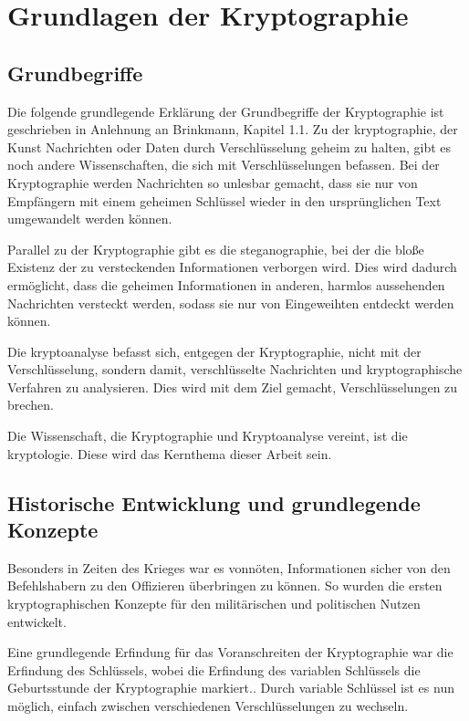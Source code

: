 \newpage


\section{Grundlagen der Kryptographie}\label{sec:grundlagen-der-kryptographie}

\subsection{Grundbegriffe}\label{subsec:grundbegriffe}
Die folgende grundlegende Erklärung der Grundbegriffe der Kryptographie ist
geschrieben in Anlehnung an Brinkmann, Kapitel 1.1. Zu der \gls{kryptographie},
der Kunst Nachrichten oder Daten durch Verschlüsselung geheim zu halten, gibt es
noch andere Wissenschaften, die sich mit Verschlüsselungen befassen.
Bei der Kryptographie werden Nachrichten so unlesbar gemacht, dass sie nur von Empfängern
mit einem geheimen Schlüssel wieder in den ursprünglichen Text umgewandelt werden
können.

Parallel zu der Kryptographie gibt es die \gls{steganographie},
bei der die bloße Existenz der zu versteckenden Informationen verborgen wird.
Dies wird dadurch ermöglicht, dass die geheimen Informationen in anderen, harmlos aussehenden
Nachrichten versteckt werden, sodass sie nur von Eingeweihten entdeckt werden
können.

Die \gls{kryptoanalyse} befasst sich, entgegen der Kryptographie,
nicht mit der Verschlüsselung, sondern damit, verschlüsselte Nachrichten und
kryptographische Verfahren zu analysieren.
Dies wird mit dem Ziel gemacht, Verschlüsselungen zu brechen.

Die Wissenschaft, die Kryptographie und Kryptoanalyse vereint, ist die
\gls{kryptologie}.
Diese wird das Kernthema dieser Arbeit sein.\autocite[\pagef~5]{brinkmann_vak_2001}

\subsection{Historische Entwicklung und grundlegende Konzepte}\label{subsec:historische-entwicklung-und-grundlegende-konzepte}
Besonders in Zeiten des Krieges war es vonnöten, Informationen sicher von den Befehlshabern
zu den Offizieren überbringen zu können.
So wurden die ersten kryptographischen Konzepte für den militärischen und politischen Nutzen entwickelt.\autocite[]{beutelspacher_kurze_2017}

Eine grundlegende Erfindung für das Voranschreiten der Kryptographie war die Erfindung des Schlüssels, wobei die Erfindung des variablen Schlüssels die Geburtsstunde der Kryptographie markiert.\autocite[]{beutelspacher_kurze_2017}.
Durch variable Schlüssel ist es nun möglich, einfach zwischen verschiedenen Verschlüsselungen zu wechseln.

